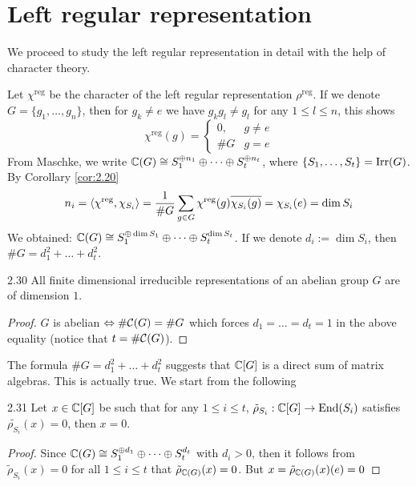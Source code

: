 \documentclass[twoside = false,	%
		headsepline,		%
		parskip = true,
		]{scrbook}						%
\begin{document}
\section{Left regular representation}
    We proceed to study the left regular representation in detail with the help of character theory.

    Let $\chi^{\text{reg}}$ be the character of the left regular representation $\rho^{\text{reg}}$. If we denote $G = \{g_1,\dots,g_n\}$, then for $g_k \neq e$ we have $g_k g_l \neq g_l$ for any $1 \leq l \leq n$, this shows
    \begin{equation*}
        \chi^{\mathrm{reg}}(g) = \left\{ \begin{array}{cc}
            0, & g \neq e \\
            \#G & g = e
        \end{array}\right.
    \end{equation*}
    From Maschke, we write $\mathbb C(G) \cong S_1^{\oplus n_1} \oplus \dots \oplus S_t^{\oplus n_t}$, where $\{S_1,\dots,S_t\} = \mathrm{Irr}(G)$. By Corollary \ref{cor:2.20}
    \begin{equation*}
        n_i = \left\langle \chi^{\text{reg}},\chi_{S_i}\right\rangle = \frac{1}{\#G}\sum_{g \in G} \chi^{\text{reg}}(g) \overline{\chi_{S_i}(g)} = \chi_{S_i}(e) = \dim S_i
    \end{equation*}
    We obtained: $\mathbb C(G) \cong S_1 ^{\oplus \dim S_1} \oplus \dots \oplus S_t^{\dim S_t}$. If we denote $d_i := \dim S_i$, then $\#G = d_1^2 + \dots + d_t^2$.
    \begin{corollary}{}{2.30}
        All finite dimensional irreducible representations of an abelian group $G$ are of dimension $1$.
    \end{corollary}
    \begin{proof}
        $G$ is abelian $\Leftrightarrow \#\mathcal C(G) = \# G$ which forces $d_1  = \dots = d_t = 1$ in the above equality (notice that $t = \#\mathcal C(G)$).
    \end{proof}
    The formula $\#G = d_1^2  +\dots + d_t^2$ suggests that $\mathbb C[G]$ is a direct sum of matrix algebras. This is actually true. We start from the following
    \begin{corollary}{}{2.31}
        Let $x \in \mathbb C[G]$ be such that for any $1 \leq i \leq t$, $\tilde{\rho}_{S_i}: \mathbb C[G] \to \mathrm{End}(S_i)$ satisfies $\tilde{\rho_{S_i}}(x) = 0$, then $x = 0$.
    \end{corollary}
    \begin{proof}
        Since $\mathbb C(G) \cong S_1 ^{\oplus d_1} \oplus \dots \oplus S_t^{d_t}$ with $d_i > 0$, then it follows from $\tilde{\rho}_{S_i}(x) = 0$ for all $1 \leq i \leq t$ that $\tilde \rho_{\mathbb C(G)}(x) = 0$. But $x = \tilde{\rho}_{\mathbb C(G)}(x)(e) = 0$
    \end{proof}
\end{document}
